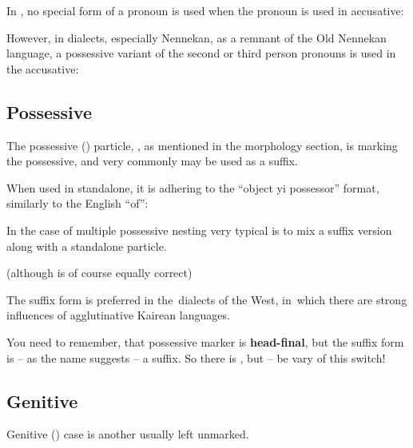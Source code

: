 In \ardo, no special form of a pronoun is used when the pronoun is used in
accusative:


However, in dialects, especially Nennekan, as a remnant of the Old Nennekan
language, a possessive variant of the second or third person pronouns is used in
the accusative:


\subsection{Possessive}

The possessive (\Poss{}) particle, , as mentioned in the morphology
section, is marking the possessive, and very commonly may be used as a suffix.

When used in standalone, it is adhering to the ``object yi possessor'' format,
similarly to the English ``of'':


In the case of multiple possessive nesting very typical is to mix a suffix
version along with a standalone particle.


(although  is of course equally
correct)

The suffix form is preferred in the~dialects of the West, in~which there are
strong influences of agglutinative Kairean languages.

You need to remember, that possessive marker is \textbf{head-final}, but the
suffix form is -- as the name suggests -- a suffix. So there is , but  -- be vary of this switch!

\subsection{Genitive}

Genitive (\Gen{}) case is another usually left unmarked.


